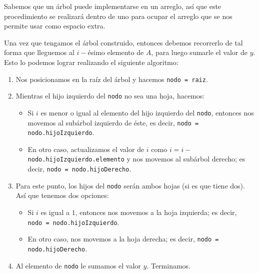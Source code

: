 \documentclass[letterpaper,11pt]{article}
\begin{document}
\begin{enumerate}
\begin{itemize}
        Sabemos que un árbol puede implementarse en un arreglo, así que este 
        procedimiento se realizará dentro de uno para ocupar el arreglo que se 
        nos permite usar como espacio extra. 
        
        Una vez que tengamos el árbol construido, entonces debemos recorrerlo de 
        tal forma que lleguemos al $i-$ésimo elemento de $A$, para luego sumarle 
        el valor de $y$. Esto lo podemos lograr realizando el siguiente 
        algoritmo:
        \begin{enumerate}
            \item Nos posicionamos en la raíz del árbol y hacemos 
            \texttt{nodo = raiz}. 

            \item Mientras el hijo izquierdo del \texttt{nodo} no sea una 
            hoja, hacemos:
            \begin{itemize}
                \item Si $i$ es menor o igual al elemento del hijo izquierdo 
                del \texttt{nodo}, entonces nos movemos al subárbol izquierdo 
                de éste, es decir, \texttt{nodo = nodo.hijoIzquierdo}.

                \item En otro caso, actualizamos el valor de $i$ como 
                $i = i -$ \texttt{nodo.hijoIzquierdo.elemento} y nos movemos 
                al subárbol derecho; es decir, \texttt{nodo = nodo.hijoDerecho}.
            \end{itemize}

            \item Para este punto, los hijos del \texttt{nodo} serán ambos 
            hojas (si es que tiene dos). Así que tenemos dos opciones:
            \begin{itemize}
                \item Si $i$ es igual a $1$, entonces nos movemos a la 
                hoja izquierda; es decir, \\ 
                \texttt{nodo = nodo.hijoIzquierdo}.

                \item En otro caso, nos movemos a la hoja derecha; es decir, 
                \texttt{nodo = nodo.hijoDerecho}.
            \end{itemize}

            \item Al elemento de \texttt{nodo} le sumamos el valor $y$. 
            Terminamos. 
        \end{enumerate}


\end{itemize}
\end{enumerate}
\end{document}
